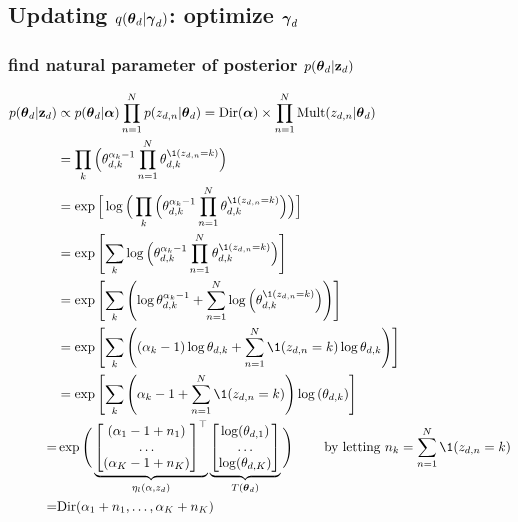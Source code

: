 \documentclass{article}
\begin{document}

\subsection{Updating $q(\boldsymbol{\theta}_d | \boldsymbol{\gamma}_d )$: optimize $\boldsymbol{\gamma}_d$}

\subsubsection{find natural parameter of posterior $p( \boldsymbol{\theta}_d | {\mathbf z}_{d} )$}


\begin{equation}\begin{split}\label{eq posterior of theta d}
p( \ttheta_d | \z_{d} ) &\propto p(\ttheta_d | \aalpha) \prod_{n=1}^N  p(z_{d,n} | \ttheta_d)
= \text{Dir} (\aalpha) \times \prod_{n=1}^N \text{Mult} ( z_{d,n} | \ttheta_d)\\ 
&= \prod_{k} \Big( \theta_{d,k}^{\alpha_k - 1} \prod_{n=1}^{N} \theta_{d,k}^{\1(z_{d,n}= k)} \Big) \\
&= \exp\Big[  \log \Big( \prod_{k} \Big( \theta_{d,k}^{\alpha_k - 1} \prod_{n=1}^{N} \theta_{d,k}^{\1(z_{d,n}= k)} \Big)  \Big) \Big]\\
&= \exp\left[  \sum_{k}  \log  \Big( \theta_{d,k}^{\alpha_k - 1} \prod_{n=1}^{N} \theta_{d,k}^{\1(z_{d,n}= k)} \Big)   \right]\\
&= \exp\left[  \sum_{k}   \left(  \log \theta_{d,k}^{\alpha_k - 1} +  \sum_{n=1}^{N} \log \left( \theta_{d,k}^{\1(z_{d,n}= k)} \right) \right)   \right]  \\
&= \exp\left[  \sum_{k}   \left(  (\alpha_k - 1) \log \theta_{d,k} +  \sum_{n=1}^{N} \1(z_{d,n} =  k) \log  \theta_{d,k}  \right)   \right]  \\
&= \exp\left[  \sum_k  \left( \alpha_k - 1 + \sum_{n=1}^{N} \1(z_{d,n} =  k) \right)  \log \left(   \theta_{d,k}   \right) \right]\\
=& \exp\Bigg( \underbrace{\begin{bmatrix} (\alpha_1 - 1 + n_1) \\ \dots \\ (\alpha_K - 1 + n_K)  \end{bmatrix}^\top}_{\eta_l \left(\alpha,  z_{d} \right)}  
\underbrace{ \begin{bmatrix} \log(\theta_{d,1}) \\ \dots \\ \log(\theta_{d,K}) \end{bmatrix}}_{T(\ttheta_d)}\Bigg) \quad\quad\text{ by letting } n_k = \sum_{n=1}^N \1( z_{d,n}= k )\\
=&\text{Dir}(\alpha_1 + n_1, \dots, \alpha_K + n_K)\\
\end{split}\end{equation}
\end{document}
